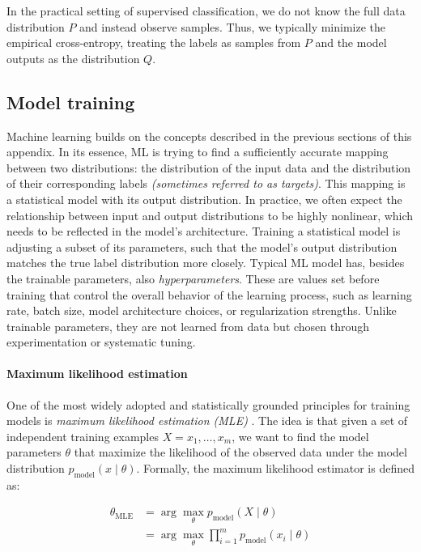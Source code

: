 In the practical setting of supervised classification, we do not know the full data distribution $P$ and instead observe samples. Thus, we typically minimize the empirical cross-entropy, treating the labels as samples from $P$ and the model outputs as the distribution $Q$.

\subsection{Model training}
\label{subsec:training}

Machine learning builds on the concepts described in the previous sections of this appendix. In its essence, ML is trying to find a sufficiently accurate mapping between two distributions: the distribution of the input data and the distribution of their corresponding labels \textit{(sometimes referred to as targets)}. This mapping is a statistical model with its output distribution. In practice, we often expect the relationship between input and output distributions to be highly nonlinear, which needs to be reflected in the model's architecture. Training a statistical model is adjusting a subset of its parameters, such that the model's output distribution matches the true label distribution more closely. Typical ML model has, besides the trainable parameters, also \emph{hyperparameters}. These are values set before training that control the overall behavior of the learning process, such as learning rate, batch size, model architecture choices, or regularization strengths. Unlike trainable parameters, they are not learned from data but chosen through experimentation or systematic tuning.

\paragraph{Maximum likelihood estimation}
One of the most widely adopted and statistically grounded principles for training models is \emph{maximum likelihood estimation (MLE)} \cite{bengio2017deep}. The idea is that given a set of independent training examples $X = x_1, \dots, x_m$, we want to find the model parameters $\theta$ that maximize the likelihood of the observed data under the model distribution $p_{\text{model}}(x \mid \theta)$. Formally, the maximum likelihood estimator is defined as:

\begin{align}
\theta_{\text{MLE}} 
&= \arg\max_{\theta} p_{\text{model}}(X \mid \theta) \label{eq:mle}\\
&= \arg\max_{\theta} \prod_{i=1}^{m} p_{\text{model}}(x_i \mid \theta)
\end{align}

